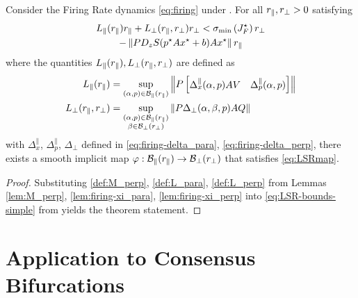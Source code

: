 \documentclass[letterpaper, 10 pt, conference]{ieeeconf}
\begin{document}
\begin{theorem}\label{thm:firing-bounds}
    Consider the Firing Rate dynamics \eqref{eq:firing} under . For all \(r_{\parallel},r_{\perp}>0\) satisfying
    \begin{multline}
        L_{\parallel}(r_{\parallel})r_{\parallel} + L_{\perp}(r_{\parallel},r_{\perp})r_{\perp}  <  \sigma_{\min}\left(J_F^{\star}\right) r_{\perp} \\ - \left\lVert{P D_{z}S(p^{\star} A x^{\star} + b) A x^{\star}}\right\rVert r_{\parallel}
    \end{multline}
    where the quantities \(L_{\parallel}(r_{\parallel}),L_{\perp}(r_{\parallel},r_{\perp})\) are defined as
    \begin{align*}
        L_{\parallel}(r_{\parallel}) & = \underset{(\alpha,p) \in \mathcal{B}_{\parallel}(r_{\parallel})}{\sup} \left\lVert{P \begin{bmatrix} \Delta^{\parallel}_{x}(\alpha,p) AV & \Delta^{\parallel}_{p}(\alpha,p) \end{bmatrix}}\right\rVert \\
        L_{\perp}(r_{\parallel},r_{\perp}) & = \underset{\substack{(\alpha,p) \in \mathcal{B}_{\parallel}(r_{\parallel})                                                                                                            \\ \beta \in \mathcal{B}_{\perp}(r_{\perp})}}{\sup} \left\lVert{P \Delta_{\perp}(\alpha,\beta,p) A Q}\right\rVert
    \end{align*}
    with \(\Delta_x^{\parallel}\), \(\Delta_p^{\parallel}\), \(\Delta_{\perp}\) defined in \eqref{eq:firing-delta_para}, \eqref{eq:firing-delta_perp}, there exists a smooth implicit map \(\varphi : \mathcal{B}_{\parallel}(r_{\parallel}) \to \mathcal{B}_{\perp}(r_{\perp})\) that satisfies \eqref{eq:LSRmap}.
\end{theorem}
\begin{proof}
    Substituting \eqref{def:M_perp}, \eqref{def:L_para}, \eqref{def:L_perp} from Lemmas \ref{lem:M_perp}, \ref{lem:firing-xi_para}, \ref{lem:firing-xi_perp} into \eqref{eq:LSR-bounds-simple} from  yields the theorem statement.
\end{proof}


\section{Application to Consensus Bifurcations}
\label{sec:example}
\end{document}
